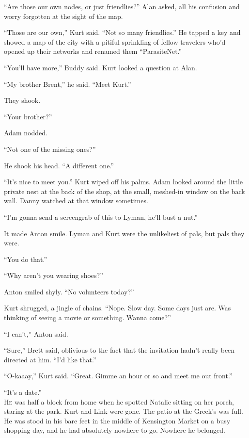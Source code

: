 \documentclass{article}
\begin{document}
``Are those our own nodes, or just friendlies?'' Alan asked, all his
confusion and worry forgotten at the sight of the map. 

``Those are our own,'' Kurt said.  ``Not so many friendlies.'' He
tapped a key and showed a map of the city with a pitiful sprinkling of
fellow travelers who'd opened up their networks and renamed them
``ParasiteNet.''

``You'll have more,'' Buddy said.  Kurt looked a question at Alan.

``My brother Brent,'' he said.  ``Meet Kurt.''

They shook. 

``Your brother?''

Adam nodded.

``Not one of the missing ones?''

He shook his head.  ``A different one.''

``It's nice to meet you.'' Kurt wiped off his palms.  Adam looked
around the little private nest at the back of the shop, at the small,
meshed-in window on the back wall.  Danny watched at that window
sometimes.

``I'm gonna send a screengrab of this to Lyman, he'll bust a nut.''

It made Anton smile.  Lyman and Kurt were the unlikeliest of pals, but
pals they were.

``You do that.''

``Why aren't you wearing shoes?''

Anton smiled shyly.  ``No volunteers today?''

Kurt shrugged, a jingle of chains.  ``Nope.  Slow day.  Some days just
are.  Was thinking of seeing a movie or something.  Wanna come?''

``I can't,'' Anton said. 

``Sure,'' Brett said, oblivious to the fact that the invitation hadn't
really been directed at him.  ``I'd like that.''

``O-kaaay,'' Kurt said.  ``Great.  Gimme an hour or so and meet me out
front.''

``It's a date.''
\\
\lettrine[lines=3, lhang=.5, nindent=0pt, findent=2pt]{H}{e} was half a block from home when he spotted Natalie sitting on her
porch, staring at the park.  Kurt and Link were gone.  The patio at
the Greek's was full.  He was stood in his bare feet in the middle of
Kensington Market on a busy shopping day, and he had absolutely
nowhere to go.  Nowhere he belonged.
\end{document}
